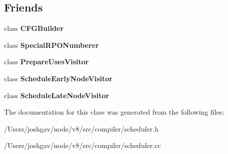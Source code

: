 \subsection*{Friends}
\begin{DoxyCompactItemize}
\item 
class {\bfseries C\+F\+G\+Builder}\hypertarget{classv8_1_1internal_1_1compiler_1_1_scheduler_a651ba68d55963fc2c72f63d3d9dc8d35}{}\label{classv8_1_1internal_1_1compiler_1_1_scheduler_a651ba68d55963fc2c72f63d3d9dc8d35}

\item 
class {\bfseries Special\+R\+P\+O\+Numberer}\hypertarget{classv8_1_1internal_1_1compiler_1_1_scheduler_a70b85df8387fa930fde2fb246ee98b9c}{}\label{classv8_1_1internal_1_1compiler_1_1_scheduler_a70b85df8387fa930fde2fb246ee98b9c}

\item 
class {\bfseries Prepare\+Uses\+Visitor}\hypertarget{classv8_1_1internal_1_1compiler_1_1_scheduler_ac92a424aa5c252752d4dc917d9d2047b}{}\label{classv8_1_1internal_1_1compiler_1_1_scheduler_ac92a424aa5c252752d4dc917d9d2047b}

\item 
class {\bfseries Schedule\+Early\+Node\+Visitor}\hypertarget{classv8_1_1internal_1_1compiler_1_1_scheduler_a95c07d0ec2448034d53b1b8746fd092c}{}\label{classv8_1_1internal_1_1compiler_1_1_scheduler_a95c07d0ec2448034d53b1b8746fd092c}

\item 
class {\bfseries Schedule\+Late\+Node\+Visitor}\hypertarget{classv8_1_1internal_1_1compiler_1_1_scheduler_a1323738e293e91819df22cb24f986016}{}\label{classv8_1_1internal_1_1compiler_1_1_scheduler_a1323738e293e91819df22cb24f986016}

\end{DoxyCompactItemize}


The documentation for this class was generated from the following files\+:\begin{DoxyCompactItemize}
\item 
/\+Users/joshgav/node/v8/src/compiler/scheduler.\+h\item 
/\+Users/joshgav/node/v8/src/compiler/scheduler.\+cc\end{DoxyCompactItemize}
